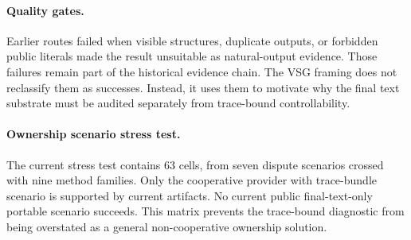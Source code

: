 \paragraph{Quality gates.}
Earlier routes failed when visible structures, duplicate outputs, or forbidden
public literals made the result unsuitable as natural-output evidence.  Those
failures remain part of the historical evidence chain.  The VSG framing does
not reclassify them as successes.  Instead, it uses them to motivate why the
final text substrate must be audited separately from trace-bound
controllability.

\paragraph{Ownership scenario stress test.}
The current stress test contains 63 cells, from seven dispute scenarios crossed
with nine method families.  Only the cooperative provider with trace-bundle
scenario is supported by current artifacts.  No current public final-text-only
portable scenario succeeds.  This matrix prevents the trace-bound diagnostic
from being overstated as a general non-cooperative ownership solution.
